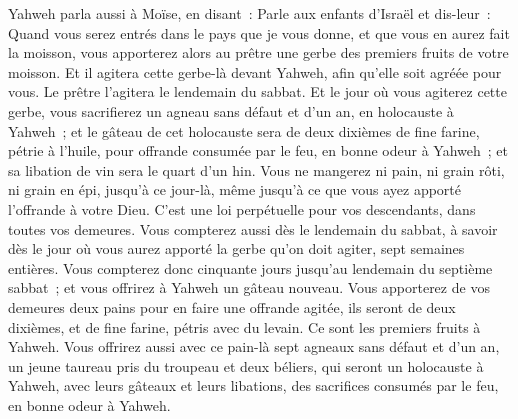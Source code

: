 \begin{multicols}{2}
Yahweh parla aussi à Moïse, en disant~:
Parle aux enfants d'Israël et dis-leur~: Quand vous serez entrés dans le pays que je vous donne, et que vous en aurez fait la moisson, vous apporterez alors au prêtre une gerbe des premiers fruits de votre moisson.
Et il agitera cette gerbe-là devant Yahweh, afin qu'elle soit agréée pour vous. Le prêtre l'agitera le lendemain du sabbat.
Et le jour où vous agiterez cette gerbe, vous sacrifierez un agneau sans défaut et d'un an, en holocauste à Yahweh~;
et le gâteau de cet holocauste sera de deux dixièmes de fine farine, pétrie à l'huile, pour offrande consumée par le feu, en bonne odeur à Yahweh~; et sa libation de vin sera le quart d'un hin.
Vous ne mangerez ni pain, ni grain rôti, ni grain en épi, jusqu'à ce jour-là, même jusqu'à ce que vous ayez apporté l'offrande à votre Dieu. C'est une loi perpétuelle pour vos descendants, dans toutes vos demeures.
Vous compterez aussi dès le lendemain du sabbat, à savoir dès le jour où vous aurez apporté la gerbe qu'on doit agiter, sept semaines entières.
Vous compterez donc cinquante jours jusqu'au lendemain du septième sabbat~; et vous offrirez à Yahweh un gâteau nouveau.
Vous apporterez de vos demeures deux pains pour en faire une offrande agitée, ils seront de deux dixièmes, et de fine farine, pétris avec du levain. Ce sont les premiers fruits à Yahweh.
Vous offrirez aussi avec ce pain-là sept agneaux sans défaut et d'un an, un jeune taureau pris du troupeau et deux béliers, qui seront un holocauste à Yahweh, avec leurs gâteaux et leurs libations, des sacrifices consumés par le feu, en bonne odeur à Yahweh.

\end{multicols}
